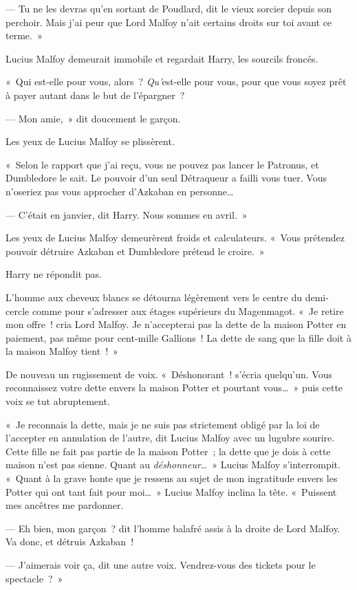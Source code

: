--- Tu ne les devras qu'en sortant de Poudlard, dit le vieux sorcier depuis son perchoir. Mais j'ai peur que Lord Malfoy n'ait certains droits sur toi avant ce terme.~»

Lucius Malfoy demeurait immobile et regardait Harry, les sourcils froncés.

«~Qui est-elle pour vous, alors~? \emph{Qu'}est-elle pour vous, pour que vous soyez prêt à payer autant dans le but de l'épargner~?

--- Mon amie,~» dit doucement le garçon.

Les yeux de Lucius Malfoy se plissèrent.

«~Selon le rapport que j'ai reçu, vous ne pouvez pas lancer le Patronus, et Dumbledore le sait. Le pouvoir d'un seul Détraqueur a failli vous tuer. Vous n'oseriez pas vous approcher d'Azkaban en personne…

--- C'était en janvier, dit Harry. Nous sommes en avril.~»

Les yeux de Lucius Malfoy demeurèrent froids et calculateurs. «~Vous prétendez pouvoir détruire Azkaban et Dumbledore prétend le croire.~»

Harry ne répondit pas.

L'homme aux cheveux blancs se détourna légèrement vers le centre du demi-cercle comme pour s'adresser aux étages supérieurs du Magenmagot. «~Je retire mon offre~! cria Lord Malfoy. Je n'accepterai pas la dette de la maison Potter en paiement, pas même pour cent-mille Gallions~! La dette de sang que la fille doit à la maison Malfoy tient~!~»

De nouveau un rugissement de voix. «~Déshonorant~! s'écria quelqu'un. Vous reconnaissez votre dette envers la maison Potter et pourtant vous…~» puis cette voix se tut abruptement.

«~Je reconnais la dette, mais je ne suis pas strictement obligé par la loi de l'accepter en annulation de l'autre, dit Lucius Malfoy avec un lugubre sourire. Cette fille ne fait pas partie de la maison Potter~; la dette que je dois à cette maison n'est pas sienne. Quant au \emph{déshonneur}…~» Lucius Malfoy s'interrompit. «~Quant à la grave honte que je ressens au sujet de mon ingratitude envers les Potter qui ont tant fait pour moi…~» Lucius Malfoy inclina la tête. «~Puissent mes ancêtres me pardonner.

--- Eh bien, mon garçon~? dit l'homme balafré assis à la droite de Lord Malfoy. Va donc, et détruis Azkaban~!

--- J'aimerais voir ça, dit une autre voix. Vendrez-vous des tickets pour le spectacle~?~»

